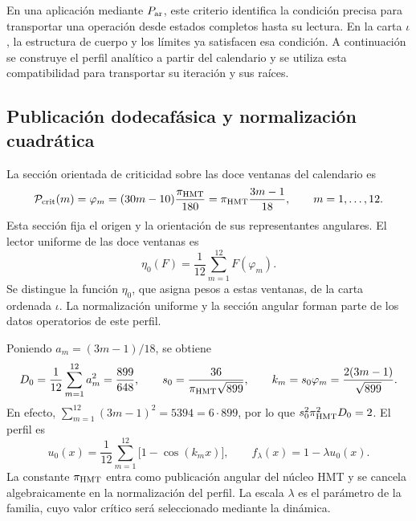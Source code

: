 En una aplicación mediante \(P_{\rm ar}\), este criterio identifica la
condición precisa para transportar una operación desde estados completos
hasta su lectura. En la carta \(\iota\), la estructura de cuerpo y
los límites ya satisfacen esa condición. A continuación se construye
el perfil analítico a partir del calendario y se utiliza esta
compatibilidad para transportar su iteración y sus raíces.

\subsection{Publicación dodecafásica y normalización cuadrática}
\label{hmtfg:perfil-dodecafasico}

La sección orientada de criticidad sobre las doce ventanas del calendario
es
\[
 \mathcal P_{\rm crit}(m)=\varphi_m
   =(30m-10)\frac{\pi_{\rm HMT}}{180}
   =\pi_{\rm HMT}\frac{3m-1}{18},\qquad m=1,\ldots,12.
\]
Esta sección fija el origen y la orientación de sus representantes
angulares. El lector uniforme de las doce ventanas es
\[
 \eta_0(F)=\frac1{12}\sum_{m=1}^{12}F(\varphi_m).
\]
Se distingue la función \(\eta_0\), que asigna pesos a estas ventanas,
de la carta ordenada \(\iota\). La normalización uniforme y la sección
angular forman parte de los datos operatorios de este perfil.

Poniendo \(a_m=(3m-1)/18\), se obtiene
\[
 D_0=\frac1{12}\sum_{m=1}^{12}a_m^2=\frac{899}{648},
 \qquad
 s_0=\frac{36}{\pi_{\rm HMT}\sqrt{899}},\qquad
 k_m=s_0\varphi_m=\frac{2(3m-1)}{\sqrt{899}}.
\]
En efecto, \(\sum_{m=1}^{12}(3m-1)^2=5394=6\cdot899\), por lo
que \(s_0^2\pi_{\rm HMT}^2D_0=2\). El perfil es
\begin{equation}
 u_0(x)=\frac1{12}\sum_{m=1}^{12}\bigl[1-\cos(k_mx)\bigr],
 \qquad f_\lambda(x)=1-\lambda u_0(x).
 \label{hmtfg:perfil-familia}
\end{equation}
La constante \(\pi_{\rm HMT}\) entra como publicación angular del
núcleo HMT y se cancela algebraicamente en la normalización del perfil.
La escala \(\lambda\) es el parámetro de la familia, cuyo valor crítico
será seleccionado mediante la dinámica.


